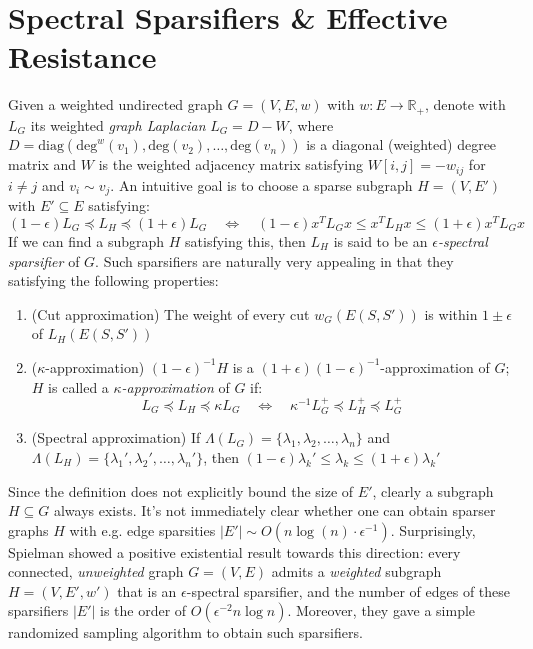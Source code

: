 \documentclass[10pt]{article}
\begin{document}
\section{Spectral Sparsifiers \& Effective Resistance}
Given a weighted undirected graph $G = (V, E, w)$ with $w: E \to \mathbb{R}_+$, denote with $L_G$ its weighted \emph{graph Laplacian} $L_G = D - W$, where $D = \mathrm{diag}(\mathrm{deg}^w(v_1), \mathrm{deg}(v_2), \dots, \mathrm{deg}(v_n))$ is a diagonal (weighted) degree matrix and $W$ is the weighted adjacency matrix satisfying $W[i,j] = -w_{ij}$ for $i \neq j$ and $v_i \sim v_j$. 
An intuitive goal is to choose a sparse subgraph $H = (V, E')$ with $E' \subseteq E$ satisfying: 
$$ (1 - \epsilon) L_G \preceq L_H \preceq (1 + \epsilon) L_G \quad \Leftrightarrow \quad (1-\epsilon)x^T L_G x \leq x^T L_H x \leq (1+\epsilon)x^T L_G x$$
If we can find a subgraph $H$ satisfying this, then $L_H$ is said to be an \emph{$\epsilon$-spectral sparsifier} of $G$. Such sparsifiers are naturally very appealing in that they satisfying the following properties: 
\begin{enumerate}
	\item (Cut approximation) The weight of every cut $w_G(E(S, S'))$ is within $1 \pm \epsilon$ of $L_H(E(S, S'))$
	\item ($\kappa$-approximation) $(1-\epsilon)^{-1}H$ is a $(1+\epsilon)(1-\epsilon)^{-1}$-approximation of $G$; $H$ is called a \emph{$\kappa$-approximation} of $G$ if:  
	$$L_G \preceq L_H \preceq \kappa L_G \quad \Leftrightarrow \quad \kappa^{-1} L_G^{+} \preceq L_H^{+} \preceq L_G^{+} $$
	\item (Spectral approximation) If $\Lambda(L_G) = \{\lambda_1, \lambda_2, \dots, \lambda_n\}$ and $\Lambda(L_H) = \{\lambda_1', \lambda_2', \dots, \lambda_n'\}$, then $(1-\epsilon) \lambda_k' \leq \lambda_k \leq (1+\epsilon) \lambda_k'$
\end{enumerate}
Since the definition does not explicitly bound the size of $E'$, clearly a subgraph $H \subseteq G$ always exists. It's not immediately clear whether one can obtain sparser graphs $H$ with e.g. edge sparsities $\lvert E' \rvert \sim O(n \log(n) \cdot \epsilon^{-1})$.
Surprisingly, Spielman showed a positive existential result towards this direction: every connected, \emph{unweighted} graph $G = (V, E)$ admits a \emph{weighted} subgraph $H = (V, E', w')$ that is an $\epsilon$-spectral sparsifier, and the number of edges of these sparsifiers $\lvert E'\rvert$ is the order of $O(\epsilon^{-2} n \log n)$. Moreover, they gave a simple randomized sampling algorithm to obtain such sparsifiers. 
\end{document}
